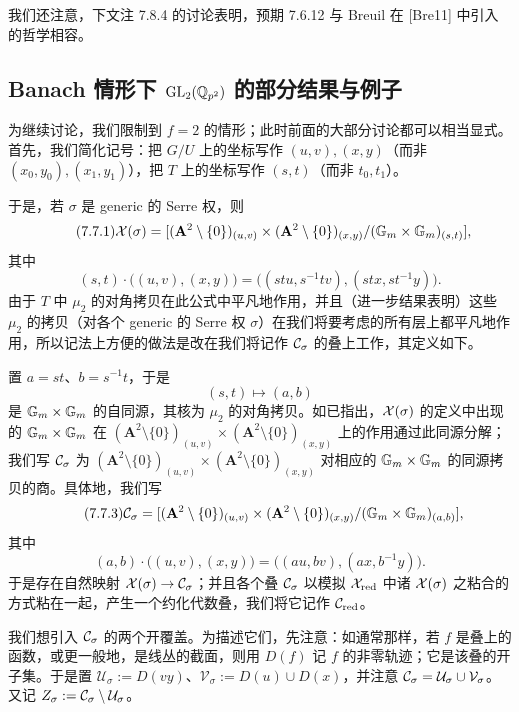 我们还注意，下文注 7.8.4 的讨论表明，预期 7.6.12 与 Breuil 在 [Bre11] 中引入的哲学相容。

\subsection{Banach 情形下 $\mathrm{GL}_2(\mathbb{Q}_{p^2})$ 的部分结果与例子}
为继续讨论，我们限制到 $f=2$ 的情形；此时前面的大部分讨论都可以相当显式。首先，我们简化记号：把 $G/U$ 上的坐标写作 $(u,v),(x,y)$（而非 $(x_0,y_0),(x_1,y_1)$），把 $T$ 上的坐标写作 $(s,t)$（而非 $t_0,t_1$）。

于是，若 $\sigma$ 是 generic 的 Serre 权，则
\begin{equation}\tag{7.7.1}\label{eq:a4-7-7-1}
\mathcal{X}(\sigma)=[(\mathbf A^2\setminus\{0\})_{(u,v)}\times(\mathbf A^2\setminus\{0\})_{(x,y)}/(\mathbb{G}_m\times\mathbb{G}_m)_{(s,t)}],
\end{equation}
其中
\[
(s,t)\cdot\bigl((u,v),(x,y)\bigr)=\bigl((stu,s^{-1}tv),(stx,st^{-1}y)\bigr).
\]
由于 $T$ 中 $\mu_2$ 的对角拷贝在此公式中平凡地作用，并且（进一步结果表明）这些 $\mu_2$ 的拷贝（对各个 generic 的 Serre 权 $\sigma$）在我们将要考虑的所有层上都平凡地作用，所以记法上方便的做法是改在我们将记作 $\mathcal{C}_\sigma$ 的叠上工作，其定义如下。

置 $a=st$、$b=s^{-1}t$，于是
\begin{equation}\tag{7.7.2}\label{eq:a4-7-7-2}
(s,t)\mapsto(a,b)
\end{equation}
是 $\mathbb{G}_m\times\mathbb{G}_m$ 的自同源，其核为 $\mu_2$ 的对角拷贝。如已指出，$\mathcal{X}(\sigma)$ 的定义中出现的 $\mathbb{G}_m\times\mathbb{G}_m$ 在 $(\mathbf A^2\setminus\{0\})_{(u,v)}\times(\mathbf A^2\setminus\{0\})_{(x,y)}$ 上的作用通过此同源分解；我们写 $\mathcal{C}_\sigma$ 为 $(\mathbf A^2\setminus\{0\})_{(u,v)}\times(\mathbf A^2\setminus\{0\})_{(x,y)}$ 对相应的 $\mathbb{G}_m\times\mathbb{G}_m$ 的同源拷贝的商。具体地，我们写
\begin{equation}\tag{7.7.3}\label{eq:a4-7-7-3}
\mathcal{C}_\sigma=[(\mathbf A^2\setminus\{0\})_{(u,v)}\times(\mathbf A^2\setminus\{0\})_{(x,y)}/(\mathbb{G}_m\times\mathbb{G}_m)_{(a,b)}],
\end{equation}
其中
\[
(a,b)\cdot\bigl((u,v),(x,y)\bigr)=\bigl((au,bv),(ax,b^{-1}y)\bigr).
\]
于是存在自然映射 $\mathcal{X}(\sigma)\to\mathcal{C}_\sigma$；并且各个叠 $\mathcal{C}_\sigma$ 以模拟 $\mathcal{X}_{\mathrm{red}}$ 中诸 $\mathcal{X}(\sigma)$ 之粘合的方式粘在一起，产生一个约化代数叠，我们将它记作 $\mathcal{C}_{\mathrm{red}}$。

我们想引入 $\mathcal{C}_\sigma$ 的两个开覆盖。为描述它们，先注意：如通常那样，若 $f$ 是叠上的函数，或更一般地，是线丛的截面，则用 $D(f)$ 记 $f$ 的非零轨迹；它是该叠的开子集。于是置 $\mathcal U_\sigma:=D(vy)$、$\mathcal V_\sigma:=D(u)\cup D(x)$，并注意 $\mathcal{C}_\sigma=\mathcal U_\sigma\cup\mathcal V_\sigma$。又记 $Z_\sigma:=\mathcal{C}_\sigma\setminus\mathcal U_\sigma$。

